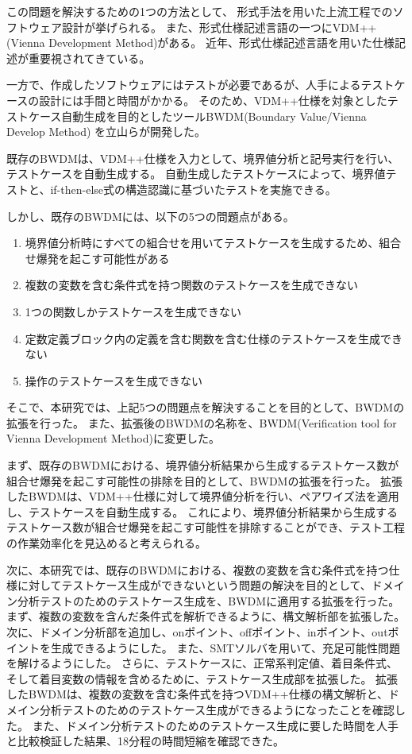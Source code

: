 \documentclass[uplatex, report, a4j, 10pt]{jsbook}
\newcommand{\tool}{BWDM}
\newcommand{\toolFullName}{Verification tool for Vienna Development Method}
\begin{document}
この問題を解決するための1つの方法として、
形式手法を用いた上流工程でのソフトウェア設計が挙げられる。
また、形式仕様記述言語の一つにVDM++(Vienna Development Method)がある。
近年、形式仕様記述言語を用いた仕様記述が重要視されてきている。

一方で、作成したソフトウェアにはテストが必要であるが、人手によるテストケースの設計には手間と時間がかかる。
そのため、VDM++仕様を対象としたテストケース自動生成を目的としたツールBWDM(Boundary Value/Vienna Develop Method)
を立山らが開発した。

既存のBWDMは、VDM++仕様を入力として、境界値分析と記号実行を行い、テストケースを自動生成する。
自動生成したテストケースによって、境界値テストと、if-then-else式の構造認識に基づいたテストを実施できる。

しかし、既存のBWDMには、以下の5つの問題点がある。

\begin{enumerate}[label=(\alph*)]
  \item 境界値分析時にすべての組合せを用いてテストケースを生成するため、組合せ爆発を起こす可能性がある
  \item 複数の変数を含む条件式を持つ関数のテストケースを生成できない
  \item 1つの関数しかテストケースを生成できない
  \item 定数定義ブロック内の定義を含む関数を含む仕様のテストケースを生成できない
  \item 操作のテストケースを生成できない
\end{enumerate}

そこで、本研究では、上記5つの問題点を解決することを目的として、BWDMの拡張を行った。
また、拡張後のBWDMの名称を、\tool{}(\toolFullName{})に変更した。

まず、既存のBWDMにおける、境界値分析結果から生成するテストケース数が組合せ爆発を起こす可能性の排除を目的として、BWDMの拡張を行った。
拡張したBWDMは、VDM++仕様に対して境界値分析を行い、ペアワイズ法を適用し、テストケースを自動生成する。
これにより、境界値分析結果から生成するテストケース数が組合せ爆発を起こす可能性を排除することができ、テスト工程の作業効率化を見込めると考えられる。

次に、本研究では、既存のBWDMにおける、複数の変数を含む条件式を持つ仕様に対してテストケース生成ができないという問題の解決を目的として、ドメイン分析テストのためのテストケース生成を、BWDMに適用する拡張を行った。
まず、複数の変数を含んだ条件式を解析できるように、構文解析部を拡張した。
次に、ドメイン分析部を追加し、onポイント、offポイント、inポイント、outポイントを生成できるようにした。
また、SMTソルバを用いて、充足可能性問題を解けるようにした。
さらに、テストケースに、正常系判定値、着目条件式、そして着目変数の情報を含めるために、テストケース生成部を拡張した。
拡張したBWDMは、複数の変数を含む条件式を持つVDM++仕様の構文解析と、ドメイン分析テストのためのテストケース生成ができるようになったことを確認した。
また、ドメイン分析テストのためのテストケース生成に要した時間を人手と比較検証した結果、18分程の時間短縮を確認できた。
\end{document}
